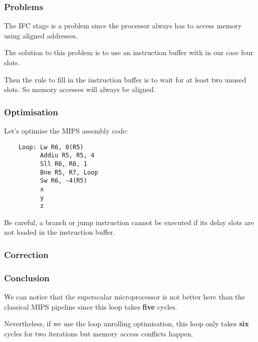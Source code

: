 \begin{frame}
  \frametitle{Problems}

  The IFC stage is a problem since the processor always has to access
  memory using aligned addresses.

  \-

  The solution to this problem is to use an instruction buffer with in our
  case four slots.

  \-

  Then the rule to fill in the instruction buffer is to wait for at least
  two unused slots. So memory accesses will always be aligned.
\end{frame}


\begin{frame}[containsverbatim]
  \frametitle{Optimisation}

  Let's optimise the MIPS assembly code:

  \begin{verbatim}
    Loop: Lw R6, 0(R5)
          Addiu R5, R5, 4
          Sll R6, R6, 1
          Bne R5, R7, Loop
          Sw R6, -4(R5)
          x
          y
          z
  \end{verbatim}

  Be careful, a branch or jump instruction cannot be executed if its delay
  slots are not loaded in the instruction buffer.
\end{frame}


\begin{frame}
  \frametitle{Correction}

  \begin{center}
  \end{center}
\end{frame}


\begin{frame}
  \frametitle{Conclusion}

  We can notice that the superscalar microprocessor is not better here
  than the classical MIPS pipeline since this loop takes \textbf{five}
  cycles.

  \-

  Nevertheless, if we use the loop unrolling optimisation, this loop
  only takes \textbf{six} cycles for two iterations but memory access
  conflicts happen.
\end{frame}


